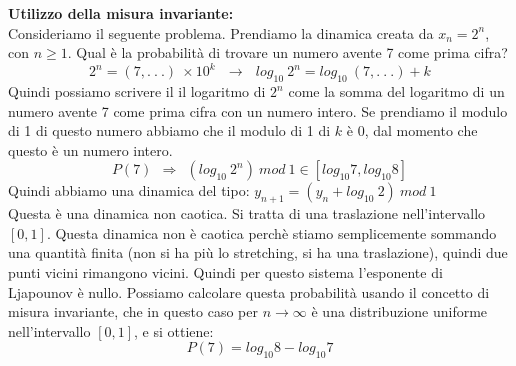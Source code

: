 \documentclass[12pt]{article}
\begin{document}
\textbf{Utilizzo della misura invariante: \\}
Consideriamo il seguente problema. Prendiamo la dinamica creata da $x_n = 2^n$, con $n \geq 1$. Qual è la probabilità di trovare un numero avente 7 come prima cifra? \\
$$
	2^n = (7, . \ . \ .) \ \times 10^k \ \ \ \longrightarrow \ \ \ log_{10} \ 2^n = log_{10} \ (7, . \ . \ .) + k
$$
Quindi possiamo scrivere il il logaritmo di $2^n$ come la somma del logaritmo di un numero avente 7 come prima cifra con un numero intero. Se prendiamo il modulo di 1 di questo numero abbiamo che il modulo di 1 di $k$ è 0, dal momento che questo è un numero intero.
$$
	P(7) \ \ \Longrightarrow \ \ (log_{10} \ 2^n) \ mod \ 1 \in [log_{10}7, log_{10}8]
$$
Quindi abbiamo una dinamica del tipo: $y_{n+1} = (y_n + log_{10} \ 2) \ mod \ 1$ \\
Questa è una dinamica non caotica. Si tratta di una traslazione nell'intervallo $[0,1]$. Questa dinamica non è caotica perchè stiamo semplicemente sommando una quantità finita (non si ha più lo stretching, si ha una traslazione), quindi due punti vicini rimangono vicini. Quindi per questo sistema l'esponente di Ljapounov è nullo. Possiamo calcolare questa probabilità usando il concetto di misura invariante, che in questo caso per $n \rightarrow \infty$ è una distribuzione uniforme nell'intervallo $[0,1]$, e si ottiene:
$$
	P(7) = log_{10}8 - log_{10}7
$$ 
\end{document}
